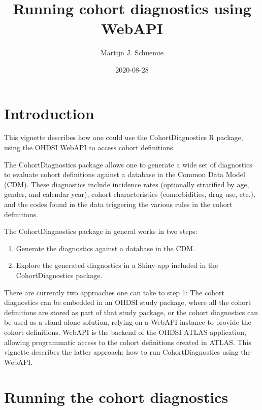 \documentclass[
]{article}
\title{Running cohort diagnostics using WebAPI}
\author{Martijn J. Schuemie}
\date{2020-08-28}
\providecommand{\tightlist}{%
  \setlength{\itemsep}{0pt}\setlength{\parskip}{0pt}}
\begin{document}
\maketitle

{
\setcounter{tocdepth}{2}
\tableofcontents
}
\hypertarget{introduction}{%
\section{Introduction}\label{introduction}}

This vignette describes how one could use the CohortDiagnostics R
package, using the OHDSI WebAPI to access cohort definitions.

The CohortDiagnostics package allows one to generate a wide set of
diagnostics to evaluate cohort definitions against a database in the
Common Data Model (CDM). These diagnostics include incidence rates
(optionally stratified by age, gender, and calendar year), cohort
characteristics (comorbidities, drug use, etc.), and the codes found in
the data triggering the various rules in the cohort definitions.

The CohortDiagnostics package in general works in two steps:

\begin{enumerate}
\def\labelenumi{\arabic{enumi}.}
\tightlist
\item
  Generate the diagnostics against a database in the CDM.
\item
  Explore the generated diagnostics in a Shiny app included in the
  CohortDiagnostics package.
\end{enumerate}

There are currently two approaches one can take to step 1: The cohort
diagnostics can be embedded in an OHDSI study package, where all the
cohort definitions are stored as part of that study package, or the
cohort diagnostics can be used as a stand-alone solution, relying on a
WebAPI instance to provide the cohort definitions. WebAPI is the backend
of the OHDSI ATLAS application, allowing programmatic access to the
cohort definitions created in ATLAS. This vignette describes the latter
approach: how to run CohortDiagnostics using the WebAPI.

\hypertarget{running-the-cohort-diagnostics}{%
\section{Running the cohort
diagnostics}\label{running-the-cohort-diagnostics}}
\end{document}
